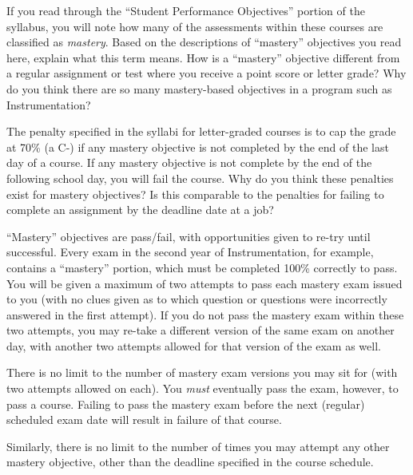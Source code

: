 

If you read through the ``Student Performance Objectives'' portion of the syllabus, you will note how many of the assessments within these courses are classified as {\it mastery}.  Based on the descriptions of ``mastery'' objectives you read here, explain what this term means.  How is a ``mastery'' objective different from a regular assignment or test where you receive a point score or letter grade?  Why do you think there are so many mastery-based objectives in a program such as Instrumentation?

\vskip 10pt

The penalty specified in the syllabi for letter-graded courses is to cap the grade at 70\% (a C-) if any mastery objective is not completed by the end of the last day of a course.  If any mastery objective is not complete by the end of the following school day, you will fail the course.  Why do you think these penalties exist for mastery objectives?  Is this comparable to the penalties for failing to complete an assignment by the deadline date at a job?







``Mastery'' objectives are pass/fail, with opportunities given to re-try until successful.  Every exam in the second year of Instrumentation, for example, contains a ``mastery'' portion, which must be completed 100\% correctly to pass.  You will be given a maximum of two attempts to pass each mastery exam issued to you (with no clues given as to which question or questions were incorrectly answered in the first attempt).  If you do not pass the mastery exam within these two attempts, you may re-take a different version of the same exam on another day, with another two attempts allowed for that version of the exam as well.

There is no limit to the number of mastery exam versions you may sit for (with two attempts allowed on each).  You {\it must} eventually pass the exam, however, to pass a course.  Failing to pass the mastery exam before the next (regular) scheduled exam date will result in failure of that course.

Similarly, there is no limit to the number of times you may attempt any other mastery objective, other than the deadline specified in the course schedule.











